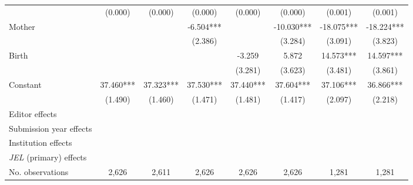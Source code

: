 \begin{table}[H]
\begin{adjustwidth}{-0.085cm}{}
\begin{threeparttable}
\begin{tabular}{p{2.64cm}SSSSSSS}
                                          &     (0.000)   &     (0.000)   &     (0.000)   &     (0.000)   &     (0.000)   &     (0.001)   &     (0.001)   \\
            Mother                        &               &               &      -6.504***&               &     -10.030***&     -18.075***&     -18.224***\\
                                          &               &               &     (2.386)   &               &     (3.284)   &     (3.091)   &     (3.823)   \\
            Birth                         &               &               &               &      -3.259   &       5.872   &      14.573***&      14.597***\\
                                          &               &               &               &     (3.281)   &     (3.623)   &     (3.481)   &     (3.861)   \\
            Constant                      &      37.460***&      37.323***&      37.530***&      37.440***&      37.604***&      37.106***&      36.866***\\
                                          &     (1.490)   &     (1.460)   &     (1.471)   &     (1.481)   &     (1.417)   &     (2.097)   &     (2.218)   \\
            \midrule
            Editor effects                &           {}   &           {}   &           {}   &           {}   &           {}   &           {}   &           {}   \\
            Submission year effects       &           {}   &           {}   &           {}   &           {}   &           {}   &           {}   &           {}   \\
            Institution effects           &           {}   &           {}   &           {}   &           {}   &           {}   &           {}   &           {}   \\
            \textit{JEL} (primary) effects&               &               &               &               &               &               &           {}   \\
            No. observations              &       2,626   &       2,611   &       2,626   &       2,626   &       2,626   &       1,281   &       1,281   \\

\end{tabular}
\end{threeparttable}
\end{adjustwidth}
\end{table}
